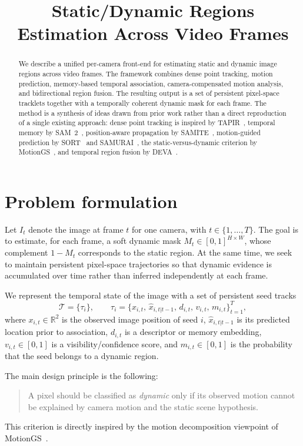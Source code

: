 \documentclass[11pt]{article}
\title{Static/Dynamic Regions Estimation Across Video Frames}
\author{}
\date{}
\begin{document}
\maketitle

\begin{abstract}
We describe a unified per-camera front-end for estimating static and dynamic image regions across video frames. The framework combines dense point tracking, motion prediction, memory-based temporal association, camera-compensated motion analysis, and bidirectional region fusion. The resulting output is a set of persistent pixel-space tracklets together with a temporally coherent dynamic mask for each frame. The method is a synthesis of ideas drawn from prior work rather than a direct reproduction of a single existing approach: dense point tracking is inspired by TAPIR~\cite{tapir2023}, temporal memory by SAM~2~\cite{sam2_2024}, position-aware propagation by SAMITE~\cite{samite2025}, motion-guided prediction by SORT~\cite{sort2016} and SAMURAI~\cite{samurai2024}, the static-versus-dynamic criterion by MotionGS~\cite{motiongs2024}, and temporal region fusion by DEVA~\cite{deva2023}.
\end{abstract}

\section{Problem formulation}
Let $I_t$ denote the image at frame $t$ for one camera, with $t \in \{1,\dots,T\}$. The goal is to estimate, for each frame, a soft dynamic mask $M_t \in [0,1]^{H\times W}$, whose complement $1-M_t$ corresponds to the static region. At the same time, we seek to maintain persistent pixel-space trajectories so that dynamic evidence is accumulated over time rather than inferred independently at each frame.

We represent the temporal state of the image with a set of persistent seed tracks
\begin{equation}
\mathcal{T}=\{\tau_i\},
\qquad
\tau_i = \{x_{i,t},\, \hat{x}_{i,t|t-1},\, d_{i,t},\, v_{i,t},\, m_{i,t}\}_{t=1}^{T},
\end{equation}
where $x_{i,t} \in \mathbb{R}^2$ is the observed image position of seed $i$, $\hat{x}_{i,t|t-1}$ is its predicted location prior to association, $d_{i,t}$ is a descriptor or memory embedding, $v_{i,t} \in [0,1]$ is a visibility/confidence score, and $m_{i,t} \in [0,1]$ is the probability that the seed belongs to a dynamic region.

The main design principle is the following:
\begin{quote}
A pixel should be classified as \emph{dynamic} only if its observed motion cannot be explained by camera motion and the static scene hypothesis.
\end{quote}
This criterion is directly inspired by the motion decomposition viewpoint of MotionGS~\cite{motiongs2024}.
\end{document}
